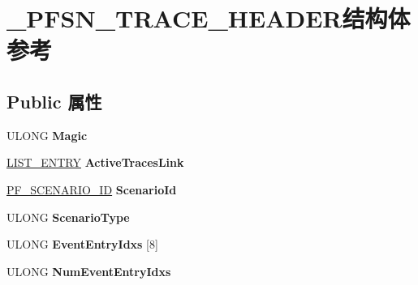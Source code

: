 \hypertarget{struct___p_f_s_n___t_r_a_c_e___h_e_a_d_e_r}{}\section{\+\_\+\+P\+F\+S\+N\+\_\+\+T\+R\+A\+C\+E\+\_\+\+H\+E\+A\+D\+E\+R结构体 参考}
\label{struct___p_f_s_n___t_r_a_c_e___h_e_a_d_e_r}
\subsection*{Public 属性}
\begin{DoxyCompactItemize}
\item 
\mbox{\label{struct___p_f_s_n___t_r_a_c_e___h_e_a_d_e_r_adc41bb22a4a6cd4187482922072c4c6a}} 
U\+L\+O\+NG {\bfseries Magic}
\item 
\mbox{\label{struct___p_f_s_n___t_r_a_c_e___h_e_a_d_e_r_a7b328eb2cdee24288700db0b87336cca}} 
\hyperlink{struct___l_i_s_t___e_n_t_r_y}{L\+I\+S\+T\+\_\+\+E\+N\+T\+RY} {\bfseries Active\+Traces\+Link}
\item 
\mbox{\label{struct___p_f_s_n___t_r_a_c_e___h_e_a_d_e_r_aa80ccad807fedaed539ee84bd538ed3f}} 
\hyperlink{struct___p_f___s_c_e_n_a_r_i_o___i_d}{P\+F\+\_\+\+S\+C\+E\+N\+A\+R\+I\+O\+\_\+\+ID} {\bfseries Scenario\+Id}
\item 
\mbox{\label{struct___p_f_s_n___t_r_a_c_e___h_e_a_d_e_r_a65f79723def0f5eab25538951f83181a}} 
U\+L\+O\+NG {\bfseries Scenario\+Type}
\item 
\mbox{\label{struct___p_f_s_n___t_r_a_c_e___h_e_a_d_e_r_a8aea1a415b7fa93444acf63aff23e397}} 
U\+L\+O\+NG {\bfseries Event\+Entry\+Idxs} \mbox{[}8\mbox{]}
\item 
\mbox{\label{struct___p_f_s_n___t_r_a_c_e___h_e_a_d_e_r_a5995d61841e839b0ee74c9beeffc2dd6}} 
U\+L\+O\+NG {\bfseries Num\+Event\+Entry\+Idxs}
\item 
\mbox{\label{struct___p_f_s_n___t_r_a_c_e___h_e_a_d_e_r_ab4ec2fd15aac8cf21035f328018772f4}} 

\end{DoxyCompactItemize}
